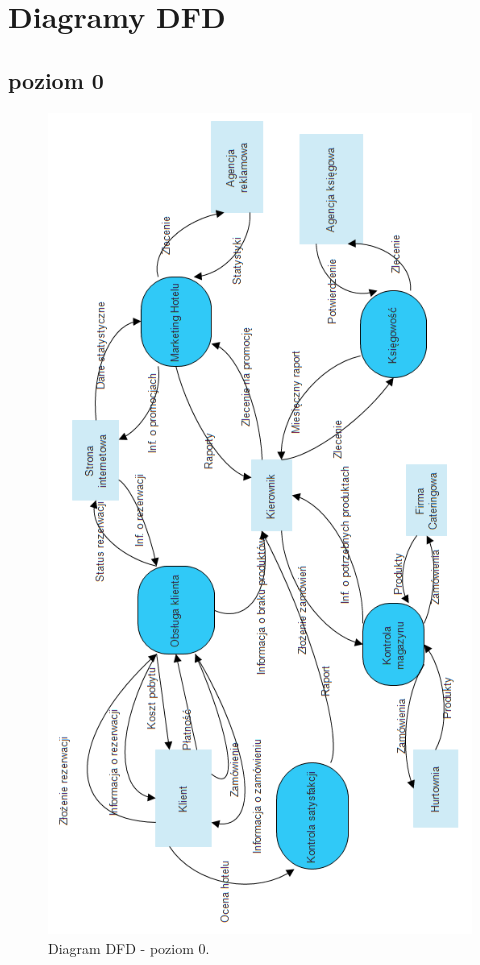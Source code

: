 \documentclass[a4paper, 11pt]{article}
\begin{document}
	\vfill		
	\section{Diagramy DFD}
	\indent
	\subsection{poziom 0}
	\indent
	\begin{figure}[H]%
			\center
			\includegraphics[scale=0.7]{Img/DFDpoziom0.png}\caption{Diagram DFD - poziom 0.}
	\end{figure}
\end{document}
